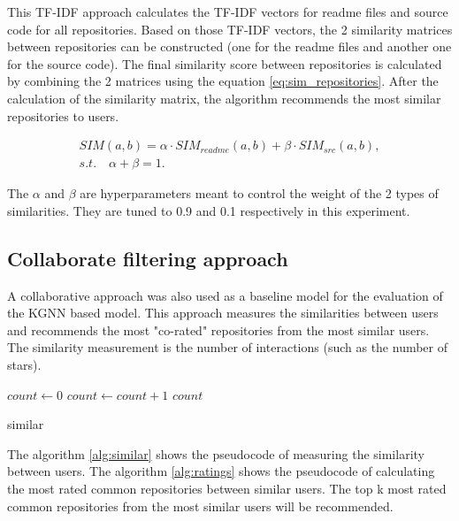 \documentclass[11pt,twoside]{report}
\begin{document}
This TF-IDF approach calculates the TF-IDF vectors for readme files and source code for all repositories. Based on those TF-IDF vectors, the 2 similarity matrices between repositories can be constructed (one for the readme files and another one for the source code). The final similarity score between repositories is calculated by combining the 2 matrices using the equation \ref{eq:sim_repositories}. After the calculation of the similarity matrix, the algorithm recommends the most similar repositories to users.

\begin{gather}
    SIM(a,b)=\alpha\cdot{SIM_{readme}(a,b)}+\beta\cdot{SIM_{src}(a,b)}, \\
    s.t.\quad\alpha+\beta=1.
    \label{eq:sim_repositories}
\end{gather}

The $\alpha$ and $\beta$ are hyperparameters meant to control the weight of the 2 types of similarities. They are tuned to 0.9 and 0.1 respectively in this experiment.

\subsection{Collaborate filtering approach}
A collaborative approach \cite{guendouz_recommending_2015} was also used as a baseline model for the evaluation of the KGNN based model. This approach measures the similarities between users and recommends the most "co-rated" repositories from the most similar users. The similarity measurement is the number of interactions (such as the number of stars).

\begin{algorithm}[H]
    \DontPrintSemicolon
    

    $count \leftarrow 0$ \newline
    {
        {
            $count \leftarrow count + 1$
        }
    }
    \Return $count$
    
    \caption{similar}
    \label{alg:similar}
\end{algorithm}

The algorithm \ref{alg:similar} shows the pseudocode of measuring the similarity between users. The algorithm \ref{alg:ratings} shows the pseudocode of calculating the most rated common repositories between similar users. The top k most rated common repositories from the most similar users will be recommended.
\end{document}
